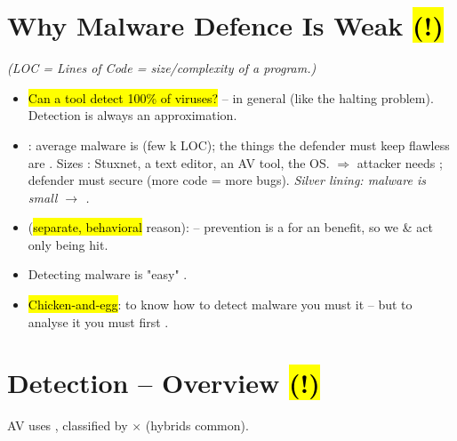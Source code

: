

\section{Why Malware Defence Is Weak \hl{(!)}}
\textit{(LOC = Lines of Code = size/complexity of a program.)}
\begin{itemize}
\item \hl{Can a tool detect 100\% of viruses?}  -- in general  (like the halting problem). Detection is always an approximation.
\item {}: average malware is  (few k LOC); the things the defender must keep flawless are . Sizes :  Stuxnet,  a text editor,  an AV tool,  the OS. $\Rightarrow$ attacker needs ; defender must secure  (more code = more bugs). \textit{Silver lining: malware is small $\to$ .}
\item {} (\hl{separate, behavioral} reason):  -- prevention is a  for an  benefit, so we  \& act only  being hit.
\item Detecting  malware is "easy" .
\item \hl{Chicken-and-egg}: to know how to detect malware you must  it -- but to analyse it you must first .
\end{itemize}

\section{Detection -- Overview \hl{(!)}}
AV uses , classified by  $\times$  (hybrids common).

